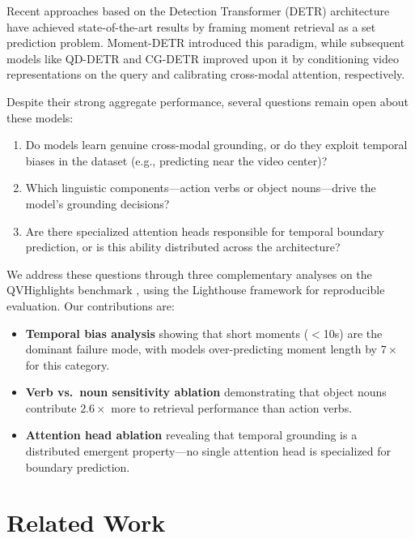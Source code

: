 \documentclass[10pt,twocolumn]{article}
\begin{document}
Recent approaches based on the Detection Transformer (DETR) \citep{carion2020detr} architecture have achieved state-of-the-art results by framing moment retrieval as a set prediction problem. Moment-DETR \citep{lei2021qvhighlights} introduced this paradigm, while subsequent models like QD-DETR \citep{moon2023qd} and CG-DETR \citep{moon2023cg} improved upon it by conditioning video representations on the query and calibrating cross-modal attention, respectively.

Despite their strong aggregate performance, several questions remain open about these models:
\begin{enumerate}[nosep,leftmargin=*]
  \item Do models learn genuine cross-modal grounding, or do they exploit temporal biases in the dataset (e.g., predicting near the video center)?
  \item Which linguistic components---action verbs or object nouns---drive the model's grounding decisions?
  \item Are there specialized attention heads responsible for temporal boundary prediction, or is this ability distributed across the architecture?
\end{enumerate}

We address these questions through three complementary analyses on the QVHighlights benchmark \citep{lei2021qvhighlights}, using the Lighthouse framework \citep{nishimura2024lighthouse} for reproducible evaluation. Our contributions are:

\begin{itemize}[nosep,leftmargin=*]
  \item \textbf{Temporal bias analysis} showing that short moments ($<$10s) are the dominant failure mode, with models over-predicting moment length by $7\times$ for this category.
  \item \textbf{Verb vs.\ noun sensitivity ablation} demonstrating that object nouns contribute $2.6\times$ more to retrieval performance than action verbs.
  \item \textbf{Attention head ablation} revealing that temporal grounding is a distributed emergent property---no single attention head is specialized for boundary prediction.
\end{itemize}

\section{Related Work}
\label{sec:related}
\end{document}
